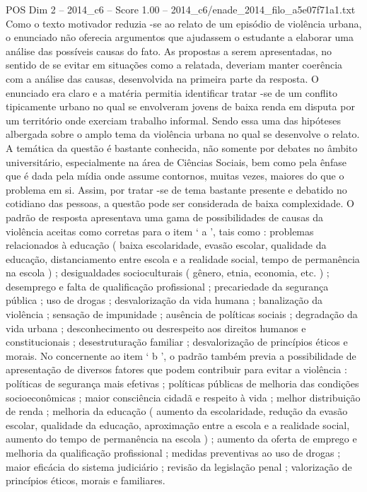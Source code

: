 \begin{textsample}{POS Dim 2 – 2014\_c6 – Score 1.00 – 2014\_c6/enade\_2014\_filo\_a5e07f71a1.txt}
Como o texto motivador reduzia -se ao relato de um episódio de violência urbana, o enunciado não oferecia argumentos que ajudassem o estudante a elaborar uma análise das possíveis causas do fato.
As propostas a serem apresentadas, no sentido de se evitar em situações como a relatada, deveriam manter coerência com a análise das causas, desenvolvida na primeira parte da resposta.
O enunciado era claro e a matéria permitia identificar tratar -se de um conflito tipicamente urbano no qual se envolveram jovens de baixa renda em disputa por um território onde exerciam trabalho informal.
Sendo essa uma das hipóteses albergada sobre o amplo tema da violência urbana no qual se desenvolve o relato.
A temática da questão é bastante conhecida, não somente por debates no âmbito universitário, especialmente na área de Ciências Sociais, bem como pela ênfase que é dada pela mídia onde assume contornos, muitas vezes, maiores do que o problema em si.
Assim, por tratar -se de tema bastante presente e debatido no cotidiano das pessoas, a questão pode ser considerada de baixa complexidade.
O padrão de resposta apresentava uma gama de possibilidades de causas da violência aceitas como corretas para o item ‘ a ’, tais como : problemas relacionados à educação ( baixa escolaridade, evasão escolar, qualidade da educação, distanciamento entre escola e a realidade social, tempo de permanência na escola ) ; desigualdades socioculturais ( gênero, etnia, economia, etc. ) ; desemprego e falta de qualificação profissional ; precariedade da segurança pública ; uso de drogas ; desvalorização da vida humana ; banalização da violência ; sensação de impunidade ; ausência de políticas sociais ; degradação da vida urbana ; desconhecimento ou desrespeito aos direitos humanos e constitucionais ; desestruturação familiar ; desvalorização de princípios éticos e morais.
No concernente ao item ‘ b ’, o padrão também previa a possibilidade de apresentação de diversos fatores que podem contribuir para evitar a violência : políticas de segurança mais efetivas ; políticas públicas de melhoria das condições socioeconômicas ; maior consciência cidadã e respeito à vida ; melhor distribuição de renda ; melhoria da educação ( aumento da escolaridade, redução da evasão escolar, qualidade da educação, aproximação entre a escola e a realidade social, aumento do tempo de permanência na escola ) ; aumento da oferta de emprego e melhoria da qualificação profissional ; medidas preventivas ao uso de drogas ; maior eficácia do sistema judiciário ; revisão da legislação penal ; valorização de princípios éticos, morais e familiares.

\end{textsample}
